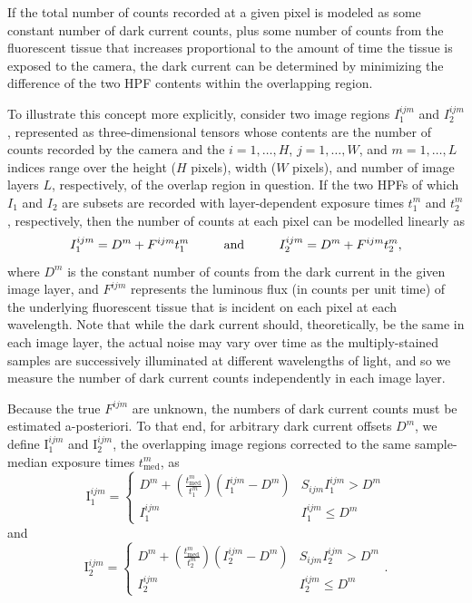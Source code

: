 \documentclass[letterpaper,11pt]{article}
\newcommand{\Iota}{\mathrm{I}}
\begin{document}
If the total number of counts recorded at a given pixel is modeled as some constant number of dark current counts, plus some number of counts from the fluorescent tissue that increases proportional to the amount of time the tissue is exposed to the camera, the dark current can be determined by minimizing the difference of the two HPF contents within the overlapping region.

To illustrate this concept more explicitly, consider two image regions $I^{ijm}_{1}$ and $I^{ijm}_{2}$, represented as three-dimensional tensors whose contents are the number of counts recorded by the camera and the $i=1, \ldots, H$, $j = 1, \ldots, W$, and $m = 1, \ldots, L$ indices range over the height ($H$ pixels), width ($W$ pixels), and number of image layers $L$, respectively, of the overlap region in question. If the two HPFs of which $I_{1}$ and $I_{2}$ are subsets are recorded with layer-dependent exposure times $t^{m}_{1}$ and $t^{m}_{2}$, respectively, then the number of counts at each pixel can be modelled linearly as
\begin{equation}
I^{ijm}_{1} = D^{m} + F^{ijm} t^{m}_{1} \hspace{0.08\textwidth} \mathrm{and} \hspace{0.08\textwidth} I^{ijm}_{2} = D^{m} + F^{ijm} t^{m}_{2},
\end{equation}
where $D^{m}$ is the constant number of counts from the dark current in the given image layer, and $F^{ijm}$ represents the luminous flux (in counts per unit time) of the underlying fluorescent tissue that is incident on each pixel at each wavelength. Note that while the dark current should, theoretically, be the same in each image layer, the actual noise may vary over time as the multiply-stained samples are successively illuminated at different wavelengths of light, and so we measure the number of dark current counts independently in each image layer.

Because the true $F^{ijm}$ are unknown, the numbers of dark current counts must be estimated a-posteriori. To that end, for arbitrary dark current offsets $D^{m}$, we define $\Iota^{ijm}_{1}$ and $\Iota^{ijm}_{2}$, the overlapping image regions corrected to the same sample-median exposure times $t^{m}_{\mathrm{med}}$, as
\begin{equation}
\Iota^{ijm}_{1} = 
\begin{cases} 
      D^{m}+\left(\frac{t^{m}_{\mathrm{med}}}{t^{m}_{1}}\right)\left(I^{ijm}_{1}-D^{m}\right) & S_{ijm} I^{ijm}_{1} > D^{m}  \\
      I^{ijm}_{1} & I^{ijm}_{1} \leq D^{m} 
\end{cases}
\label{eq:image_corr_def_1}
\end{equation}
and
\begin{equation}
\Iota^{ijm}_{2} = 
\begin{cases} 
      D^{m}+\left(\frac{t^{m}_{\mathrm{med}}}{t^{m}_{2}}\right)\left(I^{ijm}_{2}-D^{m}\right) & S_{ijm} I^{ijm}_{2} > D^{m}  \\
      I^{ijm}_{2} & I^{ijm}_{2} \leq D^{m} 
\end{cases}
.
\label{eq:image_corr_def_2}
\end{equation}
\end{document}

